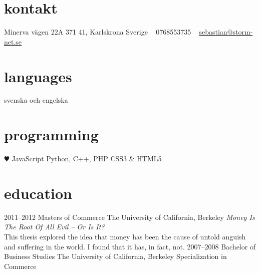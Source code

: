 \documentclass[]{friggeri-cv} %
\begin{document}


\begin{aside} %
\section{kontakt}
Minerva vägen 22A
371 41, Karlskrona
Sverige
~
0768553735
~
\href{mailto:sebastian@storm-net.se}{sebastian@storm-net.se}
\section{languages}
svenska och engelska
\section{programming}
{\color{red} $\varheartsuit$} JavaScript
Python, C++, PHP
CSS3 \& HTML5
\end{aside}


\section{education}

\begin{entrylist}
\entry
{2011--2012}
{Masters {\normalfont of Commerce}}
{The University of California, Berkeley}
{\emph{Money Is The Root Of All Evil -- Or Is It?} \\ This thesis explored the idea that money has been the cause of untold anguish and suffering in the world. I found that it has, in fact, not.}
\entry
{2007--2008}
{Bachelor {\normalfont of Business Studies}}
{The University of California, Berkeley}
{Specialization in Commerce}
\end{entrylist}
\end{document}
